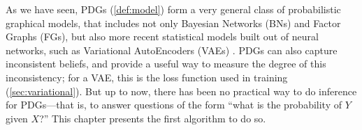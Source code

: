 As we have seen,
PDGs (\cref{def:model})
form a very general class of probabilistic graphical models,
that includes not only
Bayesian Networks (BNs) and
Factor Graphs (FGs),
but also more recent statistical models built out of neural networks,
such as Variational AutoEncoders (VAEs) \parencite{kingma2013autoencoding}.
PDGs can also capture inconsistent 
beliefs, and provide a useful way to measure the degree of this inconsistency;
for a VAE, this is the loss function used in training
    (\cref{sec:variational}).
But up to now, there has been no practical way to do inference for
PDGs---that is,
to answer questions of the form
``what is the probability of $Y$ given $X$?''
This chapter presents the first algorithm to do so.



